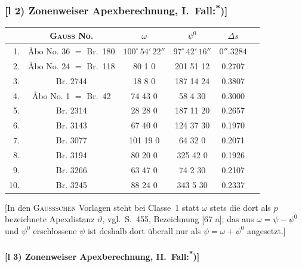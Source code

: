 \documentclass[12pt,a4paper]{article}
\theoremstyle{plain}
\theoremstyle{definition}
\theoremstyle{remark}
\begin{document}
\newpage
\subsubsection*{[l 2) Zonenweiser Apexberechnung, I.~Fall:\textsuperscript{*})]}

\begin{small}
\begin{center}
\begin{tabular}{|r|c|c|c|c|c|}
\hline
& \textsc{Gau\ss} No. & $\omega$ & $\psi^{0}$ & $\Delta s$ \\
\hline
1. & \AA bo No. 36 $=$ Br.~180 & $100^{\circ}\,54'\,22''$ & $97^{\circ}\,42'\,16''$ & $0''\!\!.3284$ \\
2. & \AA bo No. 24 $=$ Br.~118 & 80 \phantom{0}1 \phantom{0}\phantom{0}0 & 201 51 12 & 0.2707 \\
3. & Br. 2744 & 18 \phantom{0}8 \phantom{0}\phantom{0}0 & 187 14 24 & 0.3807 \\
4. & \AA bo No. 1 $=$ Br.~42 & 74 43 \phantom{0}\phantom{0}0 & 58 \phantom{0}4 30 & 0.3000 \\
5. & Br. 2314 & 28 28 \phantom{0}\phantom{0}0 & 187 11 20 & 0.2657 \\
\hline
6. & Br. 3143 & 67 40 \phantom{0}\phantom{0}0 & 124 37 30 & 0.1970 \\
7. & Br. 3077 & 101 19 \phantom{0}\phantom{0}0 & \phantom{0}64 32 \phantom{0}\phantom{0}0 & 0.2071 \\
8. & Br. 3194 & 80 20 \phantom{0}\phantom{0}0 & 325 42 \phantom{0}\phantom{0}0 & 0.1926 \\
9. & Br. 3266 & 63 47 \phantom{0}\phantom{0}0 & \phantom{0}74 \phantom{0}2 30 & 0.2107 \\
10. & Br. 3245 & 88 24 \phantom{0}\phantom{0}0 & 343 \phantom{0}5 30 & 0.2337 \\
\hline
\end{tabular}
\end{center}

[In den \textsc{Gau\ss schen} Vorlagen steht bei Classe~1 statt $\omega$ stets die dort
als $p$ bezeichnete Apexdistanz $\vartheta$, vgl.~S.~455, Bezeichnung [67 a]; das
aus $\omega = \psi - \psi^{0}$ und $\psi^{0}$ erschlossene $\psi$ ist deshalb dort \"uberall nur als
$\psi = \omega + \psi^{0}$ angesetzt.]
\end{small}

\medskip
\paragraph*{[l 3) Zonenweiser Apexberechnung, II.~Fall:\textsuperscript{*})]}
\end{document}
